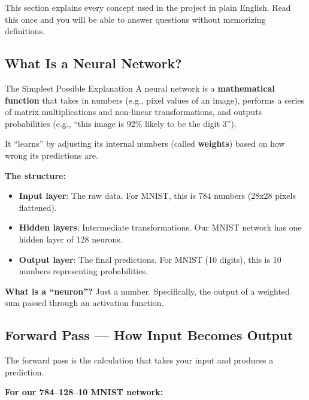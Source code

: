 \documentclass[12pt, a4paper]{article}
\begin{document}
This section explains every concept used in the project in plain English. Read this once and you will be able to answer questions without memorizing definitions.

\subsection{What Is a Neural Network?}

\begin{conceptbox}{The Simplest Possible Explanation}
A neural network is a \textbf{mathematical function} that takes in numbers (e.g., pixel values of an image), performs a series of matrix multiplications and non-linear transformations, and outputs probabilities (e.g., ``this image is 92\% likely to be the digit 3'').

It ``learns'' by adjusting its internal numbers (called \textbf{weights}) based on how wrong its predictions are.
\end{conceptbox}

\textbf{The structure:}
\begin{itemize}
  \item \textbf{Input layer}: The raw data. For MNIST, this is 784 numbers (28x28 pixels flattened).
  \item \textbf{Hidden layers}: Intermediate transformations. Our MNIST network has one hidden layer of 128 neurons.
  \item \textbf{Output layer}: The final predictions. For MNIST (10 digits), this is 10 numbers representing probabilities.
\end{itemize}

\textbf{What is a ``neuron''?} Just a number. Specifically, the output of a weighted sum passed through an activation function.

\subsection{Forward Pass --- How Input Becomes Output}

The forward pass is the calculation that takes your input and produces a prediction.

\textbf{For our 784--128--10 MNIST network:}
\end{document}
